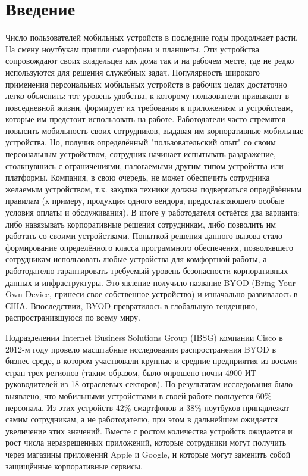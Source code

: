 \documentclass[a4paper, 12pt]{article}		%
\begin{document}


\tableofcontents{}
\newpage

\section{Введение}

Число пользователей мобильных устройств в последние годы продолжает расти. На смену ноутбукам пришли смартфоны и планшеты. Эти устройства сопровождают своих владельцев как дома так и на рабочем месте, где не редко используются для решения служебных задач. Популярность широкого применения персональных мобильных устройств в рабочих целях достаточно легко объяснить: тот уровень удобства, к которому пользователи привыкают в повседневной жизни, формирует их требования к приложениям и устройствам, которые им предстоит использовать на работе. Работодатели часто стремятся повысить мобильность своих сотрудников, выдавая им корпоративные мобильные устройства. Но, получив определённый "пользовательский опыт" со своим персональным устройством, сотрудник начинает испытывать раздражение, столкнувшись с ограничениями, налогаемыми другим типом устройства или платформы. Компания, в свою очередь, не может обеспечить сотрудника желаемым устройством, т.к. закупка техники должна подвергаться опредёлённым правилам (к примеру, продукция одного вендора, предоставляющего особые условия оплаты и обслуживания). В итоге у работодателя остаётся два варианта: либо навязывать корпоративные решения сотрудникам, либо позволить им работать со своими устройствами. Попыткой решения данного вызова стало формирование определённого класса программного обеспечения, позволявшего сотрудникам использовать любые устройства для комфортной работы, а работодателю гарантировать требуемый уровень безопасности корпоративных данных и инфраструктуры. Это явление получило название BYOD (Bring Your Own Device, принеси свое собственное устройство) и изначально развивалось в США. Впоследствии, BYOD превратилось в глобальную тенденцию, распространившуюся по всему миру.

Подразделении Internet Business Solutions Group (IBSG) компании Cisco в 2012-м году провело масштабные исследования распространения BYOD в бизнес-среде, в котором участвовали крупные и средние предприятия из восьми стран трех регионов (таким образом, было опрошено почти 4900 ИТ-руководителей из 18 отраслевых секторов). По результатам исследования \cite{PCWeek30} было выявлено, что мобильными устройствами в своей работе пользуется 60\% персонала. Из этих устройств 42\% смартфонов и 38\% ноутбуков принадлежат самим сотрудникам, а не работодателю, при этом в дальнейшем ожидается увеличение этих значений. Вместе с ростом количества устройств ожидается и рост числа неразрешенных приложений, которые сотрудники могут получить через магазины приложений Apple и Google, и которые могут заменить собой защищённые корпоративные сервисы.
\end{document}
